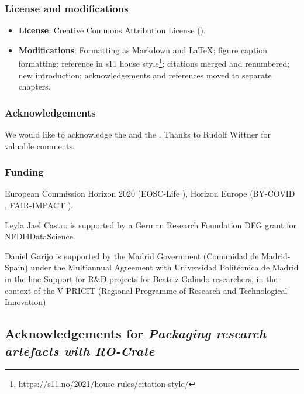 \subsubsection*{License and modifications}

\begin{itemize}
\tightlist
\item
  \textbf{License}: Creative Commons Attribution License
  ().
\item
  \textbf{Modifications}: Formatting as Markdown and LaTeX; figure caption
		formatting; reference in s11 house style\footnote{\url{https://s11.no/2021/house-rules/citation-style/}}; citations merged and renumbered; new introduction;
  acknowledgements and references moved to separate chapters.
\end{itemize}

\subsubsection*{Acknowledgements}

We would like to acknowledge the
 and the
. Thanks to Rudolf Wittner for valuable comments.

\subsubsection*{Funding}

European Commission Horizon 2020 (EOSC-Life
), Horizon
Europe (BY-COVID
,
FAIR-IMPACT
).

Leyla Jael Castro is supported by a German Research Foundation DFG grant
for NFDI4DataScience.

Daniel Garijo is supported by the Madrid Government (Comunidad de
Madrid-Spain) under the Multiannual Agreement with Universidad
Politécnica de Madrid in the line Support for R\&D projects for Beatriz
Galindo researchers, in the context of the V PRICIT (Regional Programme
of Research and Technological Innovation)




\subsection{Acknowledgements for \emph{Packaging research artefacts with RO-Crate}}\label{ch11:packagingrocrate}

